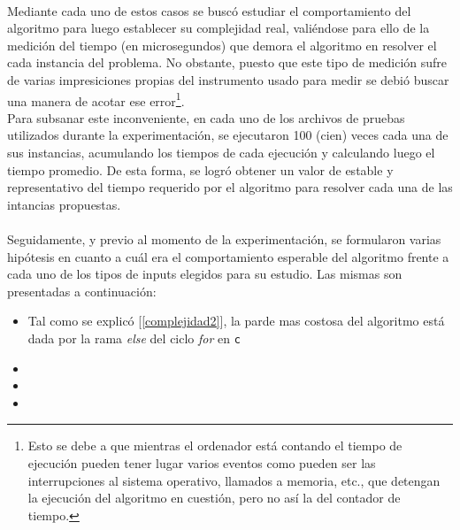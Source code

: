 \paragraph{}
Mediante cada uno de estos casos se buscó estudiar el comportamiento del algoritmo para luego establecer su complejidad real, valiéndose para ello de la medición del tiempo (en microsegundos) que demora el algoritmo en resolver el cada instancia del problema. 
No obstante, puesto que este tipo de medición sufre de varias impresiciones propias del instrumento usado para medir se debió buscar una manera de acotar ese error\footnote{Esto se debe a que mientras el ordenador está contando el tiempo de ejecución pueden tener lugar varios eventos como pueden ser las interrupciones al sistema operativo, llamados a memoria, etc., que detengan la ejecución del algoritmo en cuestión, pero no así la del contador de tiempo.}. \\
Para subsanar este inconveniente, en cada uno de los archivos de pruebas utilizados durante la experimentación, se ejecutaron 100 (cien) veces cada una de sus instancias, acumulando los tiempos de cada ejecución y calculando luego el tiempo promedio. De esta forma, se logró obtener un valor de estable y representativo del tiempo requerido por el algoritmo para resolver cada una de las intancias propuestas.

\paragraph{}
Seguidamente, y previo al momento de la experimentación, se formularon varias hipótesis en cuanto a cuál era el comportamiento esperable del algoritmo frente a cada uno de los tipos de inputs elegidos para su estudio. Las mismas son presentadas a continuación:
	\begin{itemize}
		\item[1)]{ Tal como se explicó [\ref{complejidad2}], la parde mas costosa del algoritmo está dada por la rama \textit{else} del ciclo \textit{for} en  \texttt{c} }
		\item[2)]{} 
		\item[3)]{}
		\item[4)]{}
	\end{itemize}

